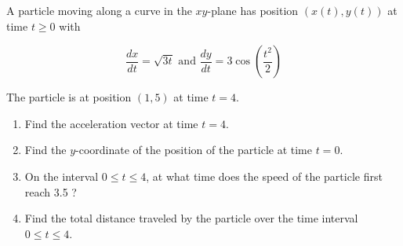 \documentclass[11pt]{exam}
\begin{document}
A particle moving along a curve in the $x y$-plane has position $(x(t), y(t))$ at time $t \geq 0$ with

$$
\frac{d x}{d t}=\sqrt{3 t} \text { and } \frac{d y}{d t}=3 \cos \left(\frac{t^{2}}{2}\right)
$$

The particle is at position $(1,5)$ at time $t=4$.
\begin{enumerate}
\item Find the acceleration vector at time $t=4$.
\item Find the $y$-coordinate of the position of the particle at time $t=0$.
\item On the interval $0 \leq t \leq 4$, at what time does the speed of the particle first reach 3.5 ?
\item Find the total distance traveled by the particle over the time interval $0 \leq t \leq 4$.
\end{enumerate}
\end{document}
